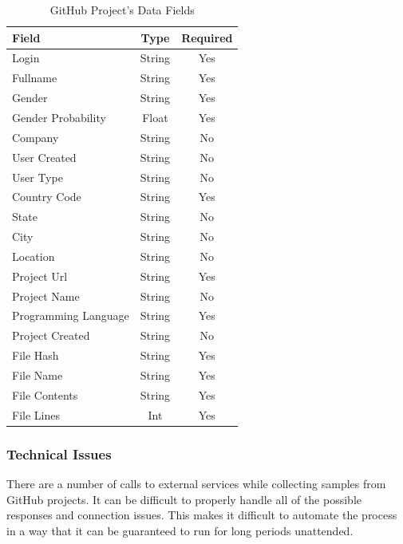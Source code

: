 \documentclass[12pt]{article}
\begin{document}
\begin{table}[t]
    \begin{center}
        \caption{GitHub Project's Data Fields}
        \label{tab:git_data}
        \begin{tabular}{|l | c | c |}
            \hline
            \textbf{Field} & \textbf{Type} & \textbf{Required}\\
            \hline
            Login & String & Yes\\
            Fullname & String & Yes\\
            Gender & String & Yes\\
            Gender Probability & Float & Yes\\
            Company & String & No\\
            User Created & String & No\\
            User Type & String & No\\
            Country Code & String & Yes\\
            State & String & No\\
            City & String & No\\
            Location & String & No\\
            \hline
            Project Url & String & Yes\\
            Project Name & String & No\\
            Programming Language & String & Yes\\
            Project Created & String & No\\
            \hline
            File Hash & String & Yes\\
            File Name & String & Yes\\
            File Contents & String & Yes\\
            File Lines & Int & Yes\\
            \hline
        \end{tabular}
    \end{center}
\end{table}

\subsubsection*{Technical Issues}
There are a number of calls to external services while collecting samples from GitHub projects. It can be difficult to properly handle all of the possible responses and connection issues. This makes it difficult to automate the process in a way that it can be guaranteed to run for long periods unattended.
\end{document}
